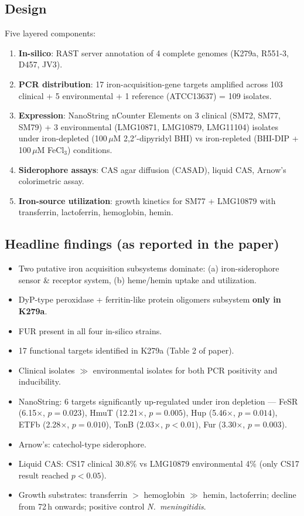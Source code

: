 \documentclass[10pt,a4paper]{article}
\begin{document}
\subsection{Design}
Five layered components:
\begin{enumerate}[leftmargin=1.4em,itemsep=1pt]
  \item \textbf{In-silico}: RAST server annotation of 4 complete genomes
        (K279a, R551-3, D457, JV3).
  \item \textbf{PCR distribution}: 17 iron-acquisition-gene targets amplified
        across 103 clinical + 5 environmental + 1 reference (ATCC13637)
        = 109 isolates.
  \item \textbf{Expression}: NanoString nCounter Elements on 3 clinical (SM72,
        SM77, SM79) + 3 environmental (LMG10871, LMG10879, LMG11104) isolates
        under iron-depleted (100\,$\mu$M 2,2$'$-dipyridyl BHI) vs
        iron-repleted (BHI-DIP + 100\,$\mu$M FeCl$_3$) conditions.
  \item \textbf{Siderophore assays}: CAS agar diffusion (CASAD), liquid CAS,
        Arnow's colorimetric assay.
  \item \textbf{Iron-source utilization}: growth kinetics for SM77 + LMG10879
        with transferrin, lactoferrin, hemoglobin, hemin.
\end{enumerate}

\subsection{Headline findings (as reported in the paper)}
\begin{itemize}[leftmargin=1.4em,itemsep=1pt]
  \item Two putative iron acquisition subsystems dominate: (a) iron-siderophore
        sensor \& receptor system, (b) heme/hemin uptake and utilization.
  \item DyP-type peroxidase + ferritin-like protein oligomers subsystem
        \textbf{only in K279a}.
  \item FUR present in all four in-silico strains.
  \item 17 functional targets identified in K279a (Table 2 of paper).
  \item Clinical isolates $\gg$ environmental isolates for both PCR positivity
        and inducibility.
  \item NanoString: 6 targets significantly up-regulated under iron depletion
        --- FeSR (6.15$\times$, $p{=}0.023$), HmuT (12.21$\times$, $p{=}0.005$),
        Hup (5.46$\times$, $p{=}0.014$), ETFb (2.28$\times$, $p{=}0.010$),
        TonB (2.03$\times$, $p{<}0.01$), Fur (3.30$\times$, $p{=}0.003$).
  \item Arnow's: catechol-type siderophore.
  \item Liquid CAS: CS17 clinical 30.8\% vs LMG10879 environmental 4\%
        (only CS17 result reached $p{<}0.05$).
  \item Growth substrates: transferrin $>$ hemoglobin $\gg$ hemin, lactoferrin;
        decline from 72\,h onwards; positive control \textit{N.\ meningitidis}.
\end{itemize}
\end{document}
